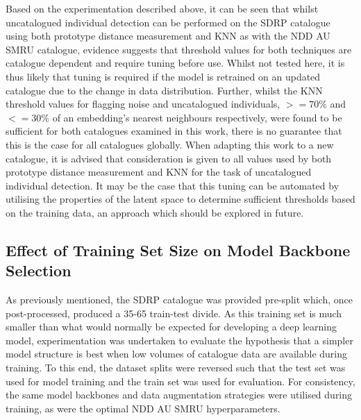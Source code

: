 Based on the experimentation described above, it can be seen that whilst uncatalogued individual detection can be performed on the SDRP catalogue using both prototype distance measurement and KNN as with the NDD AU SMRU catalogue, evidence suggests that threshold values for both techniques are catalogue dependent and require tuning before use. Whilst not tested here, it is thus likely that tuning is required if the model is retrained on an updated catalogue due to the change in data distribution. Further, whilst the KNN threshold values for flagging noise and uncatalogued individuals, $>=70\%$ and $<=30\%$  of an embedding's nearest neighbours respectively, were found to be sufficient for both catalogues examined in this work, there is no guarantee that this is the case for all catalogues globally. When adapting this work to a new catalogue, it is advised that consideration is given to all values used by both prototype distance measurement and KNN for the task of uncatalogued individual detection. It may be the case that this tuning can be automated by utilising the properties of the latent space to determine sufficient thresholds based on the training data, an approach which should be explored in future.

\subsection{Effect of Training Set Size on Model Backbone Selection}\label{ch:SNNEvaluation,sec:SDRP,sub:SDRPDataset,sub:reversedSDRP}

 As previously mentioned, the SDRP catalogue was provided pre-split which, once post-processed, produced a 35-65 train-test divide. As this training set is much smaller than what would normally be expected for developing a deep learning model, experimentation was undertaken to evaluate the hypothesis that a simpler model structure is best when low volumes of catalogue data are available during training. To this end, the dataset splits were reversed such that the test set was used for model training and the train set was used for evaluation. For consistency, the same model backbones and data augmentation strategies were utilised during training, as were the optimal NDD AU SMRU hyperparameters. 

